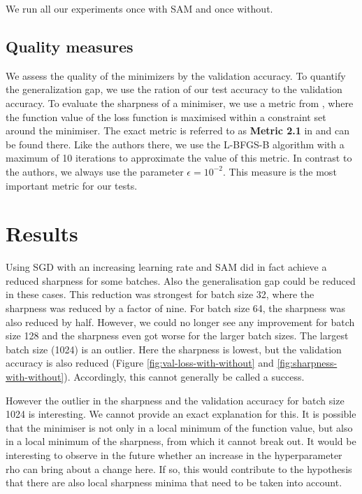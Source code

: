 \documentclass[10pt,conference,compsocconf]{IEEEtran}
\begin{document}
We run all our experiments once with SAM and once without.  

\subsection{Quality measures}
We assess the quality of the minimizers by the validation accuracy. To quantify the generalization gap, we use the ration of our test accuracy to the validation accuracy. To evaluate the sharpness of a minimiser, we use a metric from \cite{keskar2017largebatch}, where the function value of the loss function is maximised within a constraint set around the minimiser. The exact metric is referred to as \textbf{Metric 2.1} in \cite{keskar2017largebatch} and can be found there. Like the authors there, we use the L-BFGS-B algorithm with a maximum of 10 iterations to approximate the value of this metric. In contrast to the authors, we always use the parameter $\epsilon = 10^{-2}$. This measure is the most important metric for our tests.

\section{Results}
Using SGD with an increasing learning rate and SAM did in fact achieve a reduced sharpness for some batches. Also the generalisation gap could be reduced in these cases. This reduction was strongest for batch size 32, where the sharpness was reduced by a factor of nine. For batch size 64, the sharpness was also reduced by half. However, we could no longer see any improvement for batch size 128 and the sharpness even got worse for the larger batch sizes. The largest batch size (1024) is an outlier. Here the sharpness is lowest, but the validation accuracy is also reduced (Figure \ref{fig:val-loss-with-without} and \ref{fig:sharpness-with-without}). Accordingly, this cannot generally be called a success.

However the outlier in the sharpness and the validation accuracy for batch size 1024 is interesting. We cannot provide an exact explanation for this. It is possible that the minimiser is not only in a local minimum of the function value, but also in a local minimum of the sharpness, from which it cannot break out. It would be interesting to observe in the future whether an increase in the hyperparameter rho can bring about a change here. If so, this would contribute to the hypothesis that there are also local sharpness minima that need to be taken into account. 
\end{document}

